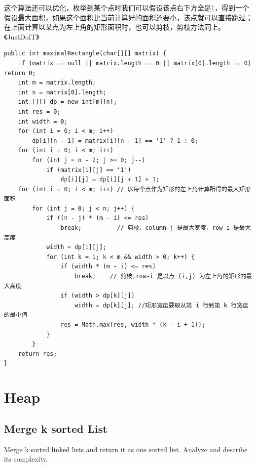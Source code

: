 \documentclass[12pt]{book}
\begin{document}
\begin{enumerate}
这个算法还可以优化，枚举到某个点时我们可以假设该点右下方全是1，得到一个假设最大面积，如果这个面积比当前计算好的面积还要小，该点就可以直接跳过；在上面计算以某点为左上角的矩形面积时，也可以剪枝，剪枝方法同上。《JustDoIT》
\lstset{language=java,label= ,caption= ,numbers=none}
\begin{lstlisting}
public int maximalRectangle(char[][] matrix) {
    if (matrix == null || matrix.length == 0 || matrix[0].length == 0) return 0;
    int m = matrix.length;
    int n = matrix[0].length;
    int [][] dp = new int[m][n];
    int res = 0;
    int width = 0;
    for (int i = 0; i < m; i++) 
        dp[i][n - 1] = matrix[i][n - 1] == '1' ? 1 : 0;
    for (int i = 0; i < m; i++) 
        for (int j = n - 2; j >= 0; j--) 
            if (matrix[i][j] == '1')
                dp[i][j] = dp[i][j + 1] + 1;
    for (int i = 0; i < m; i++) // 以每个点作为矩形的左上角计算所得的最大矩形面积
        for (int j = 0; j < n; j++) {
            if ((n - j) * (m - i) <= res)
                break;          // 剪枝，column-j 是最大宽度，row-i 是最大高度
            width = dp[i][j];
            for (int k = i; k < m && width > 0; k++) {
                if (width * (m - i) <= res)
                    break;    // 剪枝,row-i 是以点 (i,j) 为左上角的矩形的最大高度
                if (width > dp[k][j])
                    width = dp[k][j]; //矩形宽度要取从第 i 行到第 k 行宽度的最小值
                res = Math.max(res, width * (k - i + 1));
            }
        }
    return res;
}
\end{lstlisting}
\end{enumerate}

\section{Heap}
\label{sec-5-4}
\subsection{Merge k sorted List}
\label{sec-5-4-1}
Merge k sorted linked lists and return it as one sorted list. Analyze and describe its complexity.
\end{document}
